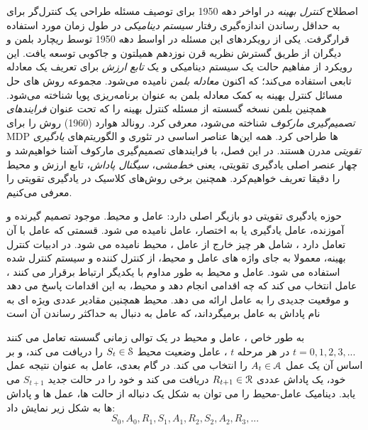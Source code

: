 

اصطلاح \textit{کنترل بهینه}
در اواخر دهه 1950 برای توصیف مسئله طراحی یک کنترل‌گر برای به حداقل رساندن اندازه‌گیری رفتار \textit{سیستم دینامیکی} در طول زمان مورد استفاده قرارگرفت. یکی از رویکردهای این مسئله در اواسط دهه 1950 توسط ریچارد بلمن و دیگران از طریق گسترش نظریه قرن نوزدهم همیلتون و جاکوبی توسعه یافت. این رویکرد از مفاهیم حالت یک سیستم دینامیکی و یک \textit{تابع ارزش} برای تعریف یک معادله تابعی استفاده می‌کند؛ که اکنون \textit{معادله بلمن} نامیده می‌شود. مجموعه روش های حل مسائل کنترل بهینه به کمک معادله بلمن به عنوان برنامه‌ریزی پویا شناخته می‌شود. همچنین بلمن نسخه گسسته از مسئله کنترل بهینه را که تحت عنوان \textit{فرایندهای تصمیم‌گیری مارکوف} 
 شناخته می‌شود، معرفی کرد. رونالد هوارد (1960) روش
  را برای MDP ها طراحی کرد. همه این‌ها عناصر اساسی در تئوری و الگوریتم‌های \textit{یادگیری تقویتی} مدرن هستند.
  در این فصل، با فرایندهای تصمیم‌گیری مارکوف آشنا خواهیم‌شد و چهار عنصر اصلی یادگیری تقویتی، یعنی \textit{خط‌مشی}، \textit{سیگنال پاداش}، تابع ارزش  و محیط را دقیقا تعریف خواهیم‌کرد. همچنین برخی روش‌های کلاسیک در یادگیری تقویتی را معرفی می‌کنیم.

حوزه یادگیری تقویتی  دو بازیگر اصلی دارد: عامل و محیط. موجود تصمیم گیرنده و آموزنده، عامل یادگیری یا به اختصار، عامل نامیده می شود. قسمتی که عامل با آن تعامل دارد ، شامل
هر چیز خارج از عامل ، محیط نامیده می شود.  در ادبیات کنترل بهینه، معمولا به  جای واژه های عامل و محیط، از کنترل کننده و سیستم کنترل شده استفاده می شود.
 عامل و محیط به طور مداوم با یکدیگر ارتباط برقرار می کنند ، عامل انتخاب می کند که چه اقدامی انجام دهد و محیط، به این اقدامات پاسخ می دهد و موقعیت جدیدی را به عامل ارائه می دهد.
محیط همچنین مقادیر عددی ویژه ای به نام پاداش  به عامل برمیگرداند، که عامل به دنبال به حداکثر رساندن آن است

به طور خاص ، عامل و محیط در یک توالی زمانی گسسته تعامل می کنند 
$t = 0,1,2,3,...$
در هر مرحله $t$ ، عامل وضعیت محیط  
$S_t \in \EuScript{S}$
را دریافت می کند، و بر اساس آن یک عمل 
$A_t \in \EuScript{A}$
را انتخاب می کند. در گام بعدی، عامل به عنوان نتیجه عمل خود، یک پاداش عددی $R_{t+1} \in \EuScript{R}$ دریافت می کند و خود را در حالت جدید $S_{t+1}$ می یابد.
دینامیک عامل-محیط را می توان به شکل یک دنباله از حالت ها، عمل ها و پاداش ها به شکل زیر نمایش داد:
$$S_0, A_0, R_1, S_1, A_1, R_2, S_2, A_2, R_3, ...$$

